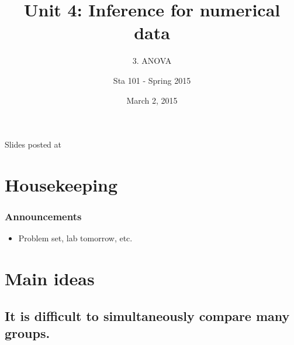 \documentclass[slidestop,compress,mathserif,12pt,t,professionalfonts,xcolor=table]{beamer}
\title{Unit 4: Inference for numerical data}
\subtitle{3. ANOVA}
\author{Sta 101 - Spring 2015}
\date{March 2, 2015}
\institute{Duke University, Department of Statistical Science}
\newcommand{\mainideaA}{It is difficult to simultaneously compare many groups.}
\begin{document}


\begin{frame}[plain]

\titlepage
\vfill
{\scriptsize {} \hfill Slides posted at  \webLink{\CourseSite}{\CourseSite}}
\addtocounter{framenumber}{-1} 

\end{frame}


\section{Housekeeping}


\begin{frame}
\frametitle{Announcements}

\begin{itemize}

\item Problem set, lab tomorrow, etc.

\end{itemize}

\end{frame}


\section{Main ideas}


\subsection{\mainideaA}
\label{mi1}

\end{document}
